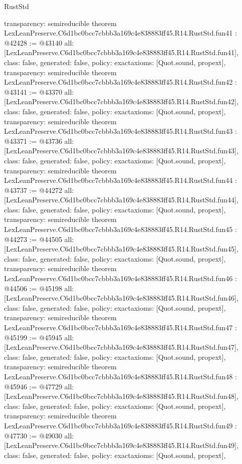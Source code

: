 \begin{lexlean}{RustStd}
\begin{coremodule}
{  transparency: semireducible
}
theorem LexLeanPreserve.C6d1bc0bcc7cbbb3a169c4e838883ff45.R14.RustStd.fun41 : @42428 := @43140 {
  all: [LexLeanPreserve.C6d1bc0bcc7cbbb3a169c4e838883ff45.R14.RustStd.fun41],
  class: false,
  generated: false,
  policy: exact{axioms: [Quot.sound, propext]},
  transparency: semireducible
}
theorem LexLeanPreserve.C6d1bc0bcc7cbbb3a169c4e838883ff45.R14.RustStd.fun42 : @43141 := @43370 {
  all: [LexLeanPreserve.C6d1bc0bcc7cbbb3a169c4e838883ff45.R14.RustStd.fun42],
  class: false,
  generated: false,
  policy: exact{axioms: [Quot.sound, propext]},
  transparency: semireducible
}
theorem LexLeanPreserve.C6d1bc0bcc7cbbb3a169c4e838883ff45.R14.RustStd.fun43 : @43371 := @43736 {
  all: [LexLeanPreserve.C6d1bc0bcc7cbbb3a169c4e838883ff45.R14.RustStd.fun43],
  class: false,
  generated: false,
  policy: exact{axioms: [Quot.sound, propext]},
  transparency: semireducible
}
theorem LexLeanPreserve.C6d1bc0bcc7cbbb3a169c4e838883ff45.R14.RustStd.fun44 : @43737 := @44272 {
  all: [LexLeanPreserve.C6d1bc0bcc7cbbb3a169c4e838883ff45.R14.RustStd.fun44],
  class: false,
  generated: false,
  policy: exact{axioms: [Quot.sound, propext]},
  transparency: semireducible
}
theorem LexLeanPreserve.C6d1bc0bcc7cbbb3a169c4e838883ff45.R14.RustStd.fun45 : @44273 := @44505 {
  all: [LexLeanPreserve.C6d1bc0bcc7cbbb3a169c4e838883ff45.R14.RustStd.fun45],
  class: false,
  generated: false,
  policy: exact{axioms: [Quot.sound, propext]},
  transparency: semireducible
}
theorem LexLeanPreserve.C6d1bc0bcc7cbbb3a169c4e838883ff45.R14.RustStd.fun46 : @44506 := @45198 {
  all: [LexLeanPreserve.C6d1bc0bcc7cbbb3a169c4e838883ff45.R14.RustStd.fun46],
  class: false,
  generated: false,
  policy: exact{axioms: [Quot.sound, propext]},
  transparency: semireducible
}
theorem LexLeanPreserve.C6d1bc0bcc7cbbb3a169c4e838883ff45.R14.RustStd.fun47 : @45199 := @45945 {
  all: [LexLeanPreserve.C6d1bc0bcc7cbbb3a169c4e838883ff45.R14.RustStd.fun47],
  class: false,
  generated: false,
  policy: exact{axioms: [Quot.sound, propext]},
  transparency: semireducible
}
theorem LexLeanPreserve.C6d1bc0bcc7cbbb3a169c4e838883ff45.R14.RustStd.fun48 : @45946 := @47729 {
  all: [LexLeanPreserve.C6d1bc0bcc7cbbb3a169c4e838883ff45.R14.RustStd.fun48],
  class: false,
  generated: false,
  policy: exact{axioms: [Quot.sound, propext]},
  transparency: semireducible
}
theorem LexLeanPreserve.C6d1bc0bcc7cbbb3a169c4e838883ff45.R14.RustStd.fun49 : @47730 := @49030 {
  all: [LexLeanPreserve.C6d1bc0bcc7cbbb3a169c4e838883ff45.R14.RustStd.fun49],
  class: false,
  generated: false,
  policy: exact{axioms: [Quot.sound, propext]},
}
\end{coremodule}
\end{lexlean}
